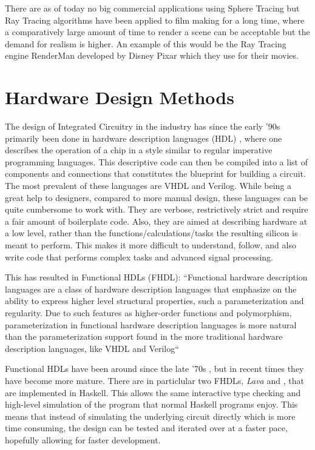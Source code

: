 		There are as of today no big commercial applications using Sphere
		Tracing but Ray Tracing algorithms have been applied to film making for
		a long time\cite{TODO}, where a comparatively large amount of time to
		render a scene can be acceptable but the demand for realism is higher.
		An example of this would be the Ray Tracing engine RenderMan developed
		by Disney Pixar which they use for their movies.\cite{TODO}
	
	\section{ Hardware Design Methods } 
	
		The design of Integrated Circuitry in the industry has since the early
		'90s primarily been done in hardware description languages (HDL)
		\cite{Chen2012}, where one describes the operation of a chip in a style
		similar to regular imperative programming languages. This descriptive
		code can then be compiled into a list of components and connections
		that constitutes the blueprint for building a circuit. The most
		prevalent of these languages are VHDL and Verilog\cite{TODO}. While
		being a great help to designers, compared to more manual design, these
		languages can be quite cumbersome to work with. They are verbose,
		restrictively strict and require a fair amount of boilerplate code.
		Also, they are aimed at describing hardware at a low level, rather than
		the functions/calculations/tasks the resulting silicon is meant to
		perform.  This makes it more difficult to understand, follow, and also
		write code that performs complex tasks and advanced signal processing.
		
		This has resulted in Functional HDLs (FHDL): ``Functional hardware
		description languages are a class of hardware description languages
		that emphasize on the ability to express higher level structural
		properties, such a parameterization and regularity. Due to such
		features as higher-order functions and polymorphism, parameterization
		in functional hardware description languages is more natural than the
		parameterization support found in the more traditional hardware
		description languages, like VHDL and Verilog`` \cite{Baaij2009}
		
		Functional HDLs have been around since the late '70s \cite{Chen2012},
		but in recent times they have become more mature. There are in
		particlular two FHDLs, \emph{Lava} and \clash \cite{Baaij2009,
		Bjesse1998}, that are implemented in Haskell.  This allows the same
		interactive type checking and high-level simulation of the program that
		normal Haskell programs enjoy. This means that instead of simulating
		the underlying circuit directly which is more time consuming, the
		design can be tested and iterated over at a faster pace, hopefully
		allowing for faster development.
